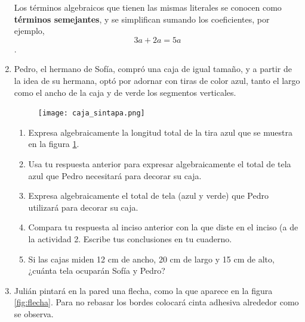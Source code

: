 \documentclass[11pt]{book}
\begin{document}
\begin{enumerate}
        \begin{boxH}
          Los términos algebraicos que tienen las mismas literales se conocen como \textbf{términos semejantes},
          y se simplifican sumando los coeficientes, por ejemplo, \[ 3a + 2a = 5a \].
        \end{boxH}

  \item Pedro, el hermano de Sofía, compró una caja de igual tamaño, y a partir de la idea de
        su hermana, optó por adornar con tiras de color azul, tanto el largo como el ancho de
        la caja y de verde los segmentos verticales.

        \begin{minipage}[t]{0.3\textwidth}
          \begin{figure}[H]
            \centering
            \texttt{[image: caja\_sintapa.png]}
            \label{fig:caja_sintapa}
          \end{figure}
        \end{minipage}\hfill
        \begin{minipage}[t]{0.7\textwidth}
          \begin{enumerate}
            \item Expresa algebraicamente la longitud total de la tira azul que se muestra en la figura \ref{fig:caja_sintapa}.
            \item Usa tu respuesta anterior para expresar algebraicamente el total de tela azul que
                  Pedro necesitará para decorar su caja.
            \item Expresa algebraicamente el total de tela (azul y verde) que Pedro utilizará para decorar su caja.
            \item Compara tu respuesta al inciso anterior con la que diste en el inciso (a de la actividad 2.
                  Escribe tus conclusiones en tu cuaderno.
            \item Si las cajas miden 12 cm de ancho, 20 cm de largo y 15 cm de alto, ¿cuánta tela ocuparán Sofía y Pedro?
          \end{enumerate}
        \end{minipage}


  \item Julián pintará en la pared una flecha, como la que aparece en la figura \ref{fig:flecha}.
        Para no rebasar los bordes colocará cinta adhesiva alrededor como se observa.


\end{enumerate}
\end{document}
